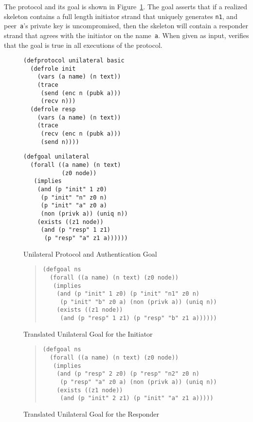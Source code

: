 \documentclass[12pt]{article}
\begin{document}
The protocol and its goal is shown in Figure~\ref{fig:unilateral}.
The goal asserts that if a realized skeleton contains a full length
initiator strand that uniquely generates \texttt{n1}, and
peer~\texttt{a}'s private key is uncompromised, then the skeleton will
contain a responder strand that agrees with the initiator on the
name~\texttt{a}.  When given as input, {\cpsa} verifies that the goal
is true in all executions of the protocol.

\begin{figure}
\begin{minipage}{2.7in}
\begin{verbatim}
(defprotocol unilateral basic
  (defrole init
    (vars (a name) (n text))
    (trace
     (send (enc n (pubk a)))
     (recv n)))
  (defrole resp
    (vars (a name) (n text))
    (trace
     (recv (enc n (pubk a)))
     (send n))))
\end{verbatim}
\end{minipage}\hfil
\begin{minipage}{3.0in}
\begin{verbatim}
(defgoal unilateral
  (forall ((a name) (n text)
           (z0 node))
   (implies
    (and (p "init" 1 z0)
     (p "init" "n" z0 n)
     (p "init" "a" z0 a)
     (non (privk a)) (uniq n))
    (exists ((z1 node))
     (and (p "resp" 1 z1)
      (p "resp" "a" z1 a))))))
\end{verbatim}
\end{minipage}
\caption{Unilateral Protocol and Authentication Goal}\label{fig:unilateral}
\end{figure}

\begin{figure}
\begin{quote}
\begin{verbatim}
(defgoal ns
  (forall ((a name) (n text) (z0 node))
   (implies
    (and (p "init" 1 z0) (p "init" "n1" z0 n)
     (p "init" "b" z0 a) (non (privk a)) (uniq n))
    (exists ((z1 node))
     (and (p "resp" 1 z1) (p "resp" "b" z1 a))))))
\end{verbatim}
\end{quote}
\caption{Translated Unilateral Goal for the
  Initiator}\label{fig:unilateral ns init}
\end{figure}

\begin{figure}
\begin{quote}
\begin{verbatim}
(defgoal ns
  (forall ((a name) (n text) (z0 node))
   (implies
    (and (p "resp" 2 z0) (p "resp" "n2" z0 n)
     (p "resp" "a" z0 a) (non (privk a)) (uniq n))
    (exists ((z1 node))
     (and (p "init" 2 z1) (p "init" "a" z1 a)))))
\end{verbatim}
\end{quote}
\caption{Translated Unilateral Goal for the
  Responder}\label{fig:unilateral ns resp}
\end{figure}
\end{document}
